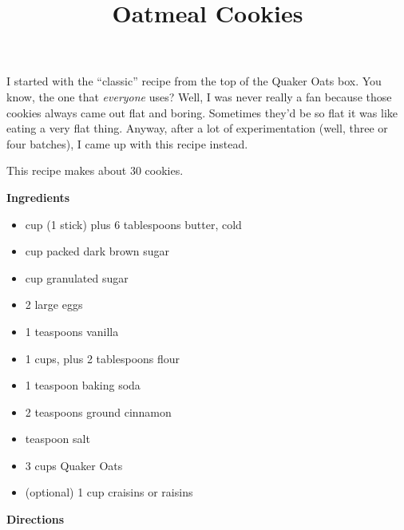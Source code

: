 \documentclass{article}
\title{Oatmeal Cookies}
\begin{document}
I started with the ``classic'' recipe from the top of the Quaker Oats box. You know,
the one that \emph{everyone} uses? Well, I was never really a fan because those
cookies always came out flat and boring. Sometimes they'd be so flat it was like
eating a very flat thing. Anyway, after a lot of experimentation (well, three or
four batches), I came up with this recipe instead.

This recipe makes about 30 cookies.

\bigskip

\textbf{Ingredients}

\begin{multicols}{2}
      \begin{itemize}
            \item {} cup (1 stick) plus 6 tablespoons butter, cold
            \item {} cup packed dark brown sugar
            \item {} cup granulated sugar
            \item 2 large eggs
            \item 1 teaspoons vanilla
            \item 1 cups, plus 2 tablespoons flour
            \item 1 teaspoon baking soda
            \item 2 teaspoons ground cinnamon
            \item {} teaspoon salt
            \item 3 cups Quaker Oats
            \item (optional) 1 cup craisins or raisins
      \end{itemize}
\end{multicols}

\bigskip

\textbf{Directions}
\end{document}
